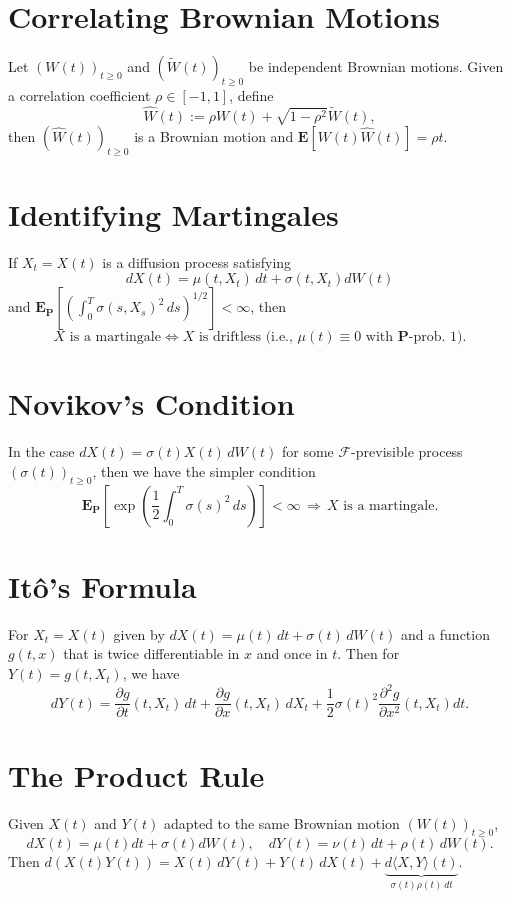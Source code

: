 \documentclass[twocolumn]{amsart}
\renewcommand{\P}{\mathbf{P}}
\newcommand{\E}{\mathbf{E}}
\newcommand{\EP}{\mathbf{E}_\mathbf{P}}
\newcommand{\F}{\mathcal{F}}
\newcommand{\QV}[1]{\langle#1\rangle}
\newcommand{\tW}{\widetilde W}
\begin{document}
\section*{Correlating Brownian Motions}
Let $(W(t))_{t \ge 0}$ and $(\tW(t))_{t \ge 0}$ be independent Brownian motions. Given a correlation coefficient $\rho \in [-1,1]$, define
\begin{equation*}
    \widehat W(t) := \rho W(t) + \sqrt{1-\rho^2} \tW(t),
\end{equation*}
then $(\widehat W(t))_{t \ge 0}$ is a Brownian motion and $\E[W(t) \widehat W(t)] = \rho t$.

\section*{Identifying Martingales}

If $X_t = X(t)$ is a diffusion process satisfying $$dX(t) = \mu(t,X_t)\,dt + \sigma(t,X_t) dW(t)$$ and $\EP[(\int_0^T \sigma(s,X_s)^2\,ds)^{1/2}] < \infty$, then
\[ X \text{ is a martingale} \iff X \text{ is driftless (i.e., $\mu(t) \equiv 0$ with $\P$-prob. 1).} \]

\section*{Novikov's Condition}

In the case $dX(t) = \sigma(t) X(t)\,dW(t)$ for some $\F$-previsible process $(\sigma(t))_{t \ge 0}$, then we have the simpler condition
\[ \EP \left[ \exp\left(\frac{1}{2} \int_0^T \sigma(s)^2\,ds\right) \right] < \infty\, \Rightarrow \, X \text{ is a martingale}. \]


\section*{It\^o's Formula}
For $X_t=X(t)$ given by $dX(t) = \mu(t)\,dt + \sigma(t)\,dW(t)$ and a function $g(t,x)$ that is twice differentiable in $x$ and once in $t$. Then for $Y(t) = g(t,X_t)$, we have
\[
dY(t) = \frac{\partial g}{\partial t}(t,X_t)\,dt + \frac{\partial g}{\partial x}(t,X_t)\,dX_t + \frac{1}{2} \sigma(t)^2 \frac{\partial ^2 g}{\partial x^2}(t,X_t)dt.
\]

\section*{The Product Rule}
Given $X(t)$ and $Y(t)$ adapted to the same Brownian motion $(W(t))_{t \ge 0}$,
\[
    dX(t) = \mu(t)dt +\sigma(t)dW(t), \quad
    dY(t) = \nu(t)\,dt + \rho(t)\,dW(t).
\]
Then $d(X(t) Y(t)) = X(t)\,d Y(t) + Y(t)\,dX(t) + \underbrace{d\QV{X,Y}(t)}_{\sigma(t) \rho(t)\,dt}$.
\end{document}
